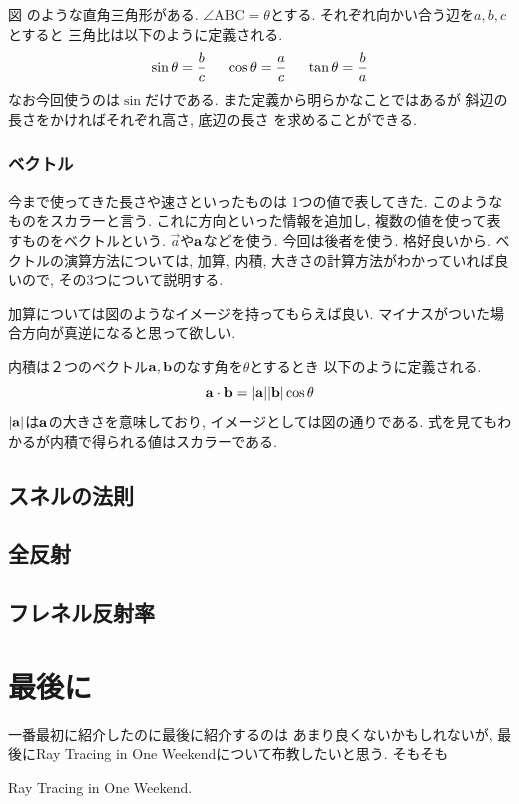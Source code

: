 \documentclass[a4paper, xelatex, ja=standard]{bxjsarticle}
\begin{document}
図 %
のような直角三角形がある.
$\angle\mathrm{ABC}=\theta$とする.
それぞれ向かい合う辺を$a, b, c$とすると
三角比は以下のように定義される.
\[
\sin{\theta}=\frac{b}{c}\hspace{5mm}
\cos{\theta}=\frac{a}{c}\hspace{5mm}
\tan{\theta}=\frac{b}{a}
\]
なお今回使うのは$\sin$だけである.
また定義から明らかなことではあるが
斜辺の長さをかければそれぞれ高さ, 底辺の長さ
を求めることができる.

\subsubsection*{ベクトル}
今まで使ってきた長さや速さといったものは
1つの値で表してきた.
このようなものをスカラーと言う.
これに方向といった情報を追加し,
複数の値を使って表すものをベクトルという.
$\vec{a}$や$\vb{a}$などを使う.
今回は後者を使う. 格好良いから.
ベクトルの演算方法については,
加算, 内積, 大きさの計算方法がわかっていれば良いので, 
その3つについて説明する.

加算については図のようなイメージを持ってもらえば良い.
マイナスがついた場合方向が真逆になると思って欲しい.

内積は２つのベクトル$\vb{a, b}$のなす角を$\theta$とするとき
以下のように定義される.
\[
\vb{a}\cdot\vb{b}=|\vb{a}||\vb{b}|\cos{\theta}
\]
$|\vb{a}|$は$\vb{a}$の大きさを意味しており,
イメージとしては図の通りである.
式を見てもわかるが内積で得られる値はスカラーである.

\subsection{スネルの法則}

\subsection{全反射}

\subsection{フレネル反射率}

\section{最後に}
一番最初に紹介したのに最後に紹介するのは
あまり良くないかもしれないが,
最後にRay Tracing in One Weekendについて布教したいと思う.
そもそも

\begin{thebibliography}{9}
 Ray Tracing in One Weekend.
\end{thebibliography}
\end{document}
